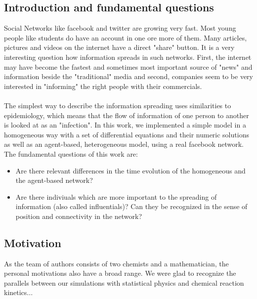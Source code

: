 \subsection{Introduction and fundamental questions}

Social Networks like facebook and twitter are growing very fast. Most young people like students do have an account in one ore more of them. Many articles, pictures and videos on the internet have a direct "share" button. It is a very interesting question how information spreads in such networks. First, the internet may have become the fastest and sometimes most important source of "news" and information beside the "traditional" media and second, companies seem to be very interested in "informing" the right people with their commercials. 
\\
\\
The simplest way to describe the information spreading uses similarities to epidemiology, which means that the flow of information of one person to another is looked at as an "infection". In this work, we implemented a simple model in a homogeneous way with a set of differential equations and their numeric solutions as well as an agent-based, heterogeneous model, using a real facebook network.
\\
The fundamental questions of this work are:

\begin{itemize}
\item Are there relevant differences in the time evolution of the homogeneous and the agent-based network?

\item Are there indiviuals which are more important to the spreading of information (also called influentials)? Can they be recognized in the sense of position and connectivity in the network?
\end{itemize}

\subsection{Motivation}

As the team of authors consists of two chemists and a mathematician, the personal motivations also have a broad range. We were glad to recognize the parallels between our simulations with statistical physics and chemical reaction kinetics... 














